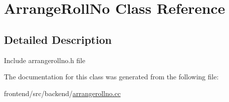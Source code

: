 \hypertarget{classArrangeRollNo}{\section{Arrange\-Roll\-No Class Reference}
\label{classArrangeRollNo}
}


\subsection{Detailed Description}
Include arrangerollno.\-h file 

The documentation for this class was generated from the following file\-:\begin{DoxyCompactItemize}
\item 
frontend/src/backend/\hyperlink{arrangerollno_8cc}{arrangerollno.\-cc}\end{DoxyCompactItemize}

